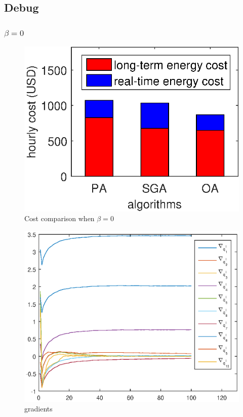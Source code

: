 \subsection{Debug}
\subsubsection{$\beta=0$}

\begin{figure}
	\centering
	\includegraphics[width=0.9\linewidth]{figs/cost_comparison_beta_0}
	\caption{Cost comparison when $\beta=0$}
	\label{fig:cost_comparison_beta_0}
\end{figure}
\begin{figure}
\centering
\includegraphics[width=0.9\linewidth]{figs/gradient_beta_0}
\caption{gradients}
\label{fig:gradient_beta_0}
\end{figure}

